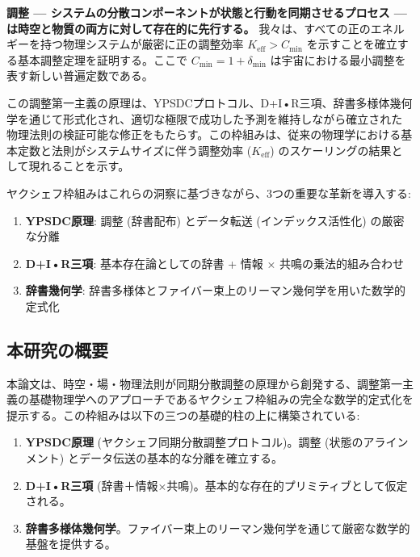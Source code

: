 \documentclass[11pt,a4paper]{article}
\begin{document}
	\textbf{調整 — システムの分散コンポーネントが状態と行動を同期させるプロセス — は時空と物質の両方に対して存在的に先行する。} 我々は、すべての正のエネルギーを持つ物理システムが厳密に正の調整効率 $K_{\mathrm{eff}} > C_{\min}$ を示すことを確立する基本調整定理を証明する。ここで $C_{\min} = 1 + \delta_{\min}$ は宇宙における最小調整を表す新しい普遍定数である。
	
	この調整第一主義の原理は、YPSDCプロトコル、D+I•R三項、辞書多様体幾何学を通じて形式化され、適切な極限で成功した予測を維持しながら確立された物理法則の検証可能な修正をもたらす。この枠組みは、従来の物理学における基本定数と法則がシステムサイズに伴う調整効率 ($K_{\mathrm{eff}}$) のスケーリングの結果として現れることを示す。
	
	ヤクシェフ枠組みはこれらの洞察に基づきながら、3つの重要な革新を導入する:
	\begin{enumerate}
		\item \textbf{YPSDC原理}: 調整 (辞書配布) とデータ転送 (インデックス活性化) の厳密な分離
		\item \textbf{D+I•R三項}: 基本存在論としての辞書 + 情報 × 共鳴の乗法的組み合わせ
		\item \textbf{辞書幾何学}: 辞書多様体とファイバー束上のリーマン幾何学を用いた数学的定式化
	\end{enumerate}
	
	\subsection{本研究の概要}
	本論文は、時空・場・物理法則が同期分散調整の原理から創発する、調整第一主義の基礎物理学へのアプローチであるヤクシェフ枠組みの完全な数学的定式化を提示する。この枠組みは以下の三つの基礎的柱の上に構築されている:
	\begin{enumerate}
		\item \textbf{YPSDC原理} (ヤクシェフ同期分散調整プロトコル)。調整 (状態のアラインメント) とデータ伝送の基本的な分離を確立する。
		\item \textbf{D+I•R三項} (辞書＋情報×共鳴)。基本的な存在的プリミティブとして仮定される。
		\item \textbf{辞書多様体幾何学}。ファイバー束上のリーマン幾何学を通じて厳密な数学的基盤を提供する。
	\end{enumerate}
	
\end{document}
